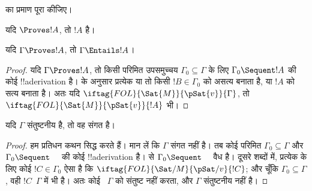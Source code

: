 \documentclass[../../../include/open-logic-section]{subfiles}
\begin{document}
\begin{prob}
 का प्रमाण पूरा कीजिए।
\end{prob}
\tagendprob

\begin{cor}
यदि $\Proves !A$, तो $!A$  है।
\end{cor}

\begin{cor}
यदि $\Gamma \Proves !A$, तो $\Gamma \Entails !A$।
\end{cor}

\begin{proof}
यदि $\Gamma \Proves !A$, तो किसी परिमित उपसमुच्चय $\Gamma_0 \subseteq
\Gamma$ के लिए $\Gamma_0 \Sequent !A$ की कोई !!a{derivation} है।
 के अनुसार प्रत्येक
या तो किसी $!B \in \Gamma_0$ को असत्य बनाता है, या $!A$ को सत्य बनाता है।
अतः यदि $\iftag{FOL}{\Sat{M}}{\pSat{v}}{\Gamma}$, तो
$\iftag{FOL}{\Sat{M}}{\pSat{v}}{!A}$ भी।
\end{proof}

\begin{cor}
यदि $\Gamma$ संतुष्टनीय है, तो वह संगत है।
\end{cor}

\begin{proof}
हम प्रतिधन कथन सिद्ध करते हैं। मान लें कि $\Gamma$ संगत नहीं है। तब कोई परिमित
$\Gamma_0 \subseteq \Gamma$ और $\Gamma_0 \Sequent \quad$ की कोई
!!a{derivation} है।  से
$\Gamma_0 \Sequent \quad$ वैध है। दूसरे शब्दों में, प्रत्येक
के लिए कोई $!C \in \Gamma_0$ ऐसा है कि
$\iftag{FOL}{\Sat/{M}}{\pSat/{v}}{!C}$; और चूँकि $\Gamma_0
\subseteq \Gamma$, वही $!C$~$\Gamma$ में भी है। अतः कोई
~$\Gamma$ को संतुष्ट नहीं करता,
और $\Gamma$ संतुष्टनीय नहीं है।
\end{proof}
\end{document}

